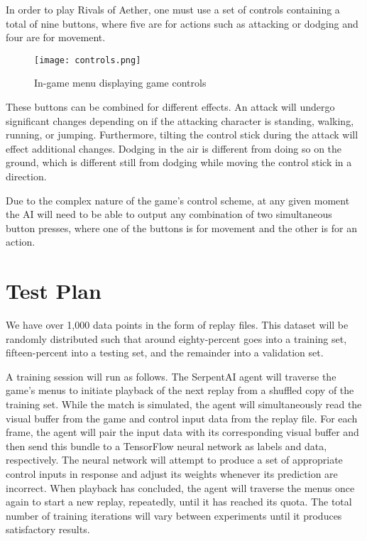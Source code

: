 In order to play Rivals of Aether, one must use a set of controls containing a total of nine buttons, where five are for actions such as attacking or dodging and four are for movement.

\begin{figure}
	\caption{In-game menu displaying game controls}
	\centering
	\texttt{[image: controls.png]} \\
\end{figure}

These buttons can be combined for different effects. An attack will undergo significant changes depending on if the attacking character is standing, walking, running, or jumping. Furthermore, tilting the control stick during the attack will effect additional changes. Dodging in the air is different from doing so on the ground, which is different still from dodging while moving the control stick in a direction.

Due to the complex nature of the game's control scheme, at any given moment the AI will need to be able to output any combination of two simultaneous button presses, where one of the buttons is for movement and the other is for an action.




\section{Test Plan}

We have over 1,000 data points in the form of replay files. This dataset will be randomly distributed such that around eighty-percent goes into a training set, fifteen-percent into a testing set, and the remainder into a validation set.

A training session will run as follows. The SerpentAI agent will traverse the game's menus to initiate playback of the next replay from a shuffled copy of the training set. While the match is simulated, the agent will simultaneously read the visual buffer from the game and control input data from the replay file. For each frame, the agent will pair the input data with its corresponding visual buffer and then send this bundle to a TensorFlow neural network as labels and data, respectively. The neural network will attempt to produce a set of appropriate control inputs in response and adjust its weights  whenever its prediction are incorrect. When playback has concluded, the agent will traverse the menus once again to start a new replay, repeatedly, until it has reached its quota. The total number of training iterations will vary between experiments until it produces satisfactory results.

